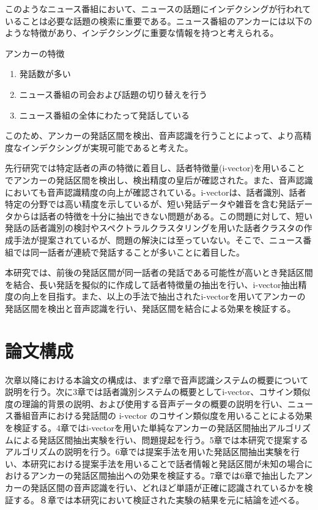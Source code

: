 このようなニュース番組において、ニュースの話題にインデクシングが行われていることは必要な話題の検索に重要である。ニュース番組のアンカーには以下のような特徴があり、インデクシングに重要な情報を持つと考えられる。\newline

アンカーの特徴
\begin{enumerate}
\item 発話数が多い
\item ニュース番組の司会および話題の切り替えを行う
\item ニュース番組の全体にわたって発話している
\end{enumerate}\par

このため、アンカーの発話区間を検出、音声認識を行うことによって、より高精度なインデクシングが実現可能であると考えた。\par
先行研究では特定話者の声の特徴に着目し、話者特徴量(i-vector)を用いることでアンカーの発話区間を検出し、検出精度の皇后が確認された。また、音声認識においても音声認識精度の向上が確認されている。i-vectorは、話者識別、話者特定の分野では高い精度を示しているが、短い発話データや雑音を含む発話データからは話者の特徴を十分に抽出できない問題がある。この問題に対して、短い発話の話者識別の検討\cite{panaiv}やスペクトラルクラスタリングを用いた話者クラスタの作成手法\cite{spectroclus}が提案されているが、問題の解決には至っていない。そこで、ニュース番組では同一話者が連続で発話することが多いことに着目した。\par
本研究では、前後の発話区間が同一話者の発話である可能性が高いとき発話区間を結合、長い発話を擬似的に作成して話者特徴量の抽出を行い、i-vector抽出精度の向上を目指す。また、以上の手法で抽出されたi-vectorを用いてアンカーの発話区間を検出と音声認識を行い、発話区間を結合による効果を検証する。

\section{論文構成}
次章以降における本論文の構成は、まず2章で音声認識システムの概要について説明を行う。次に3章では話者識別システムの概要としてi-vector、コサイン類似度の理論的背景の説明、および使用する音声データの概要の説明を行い、ニュース番組音声における発話間の i-vector のコサイン類似度を用いることによる効果を検証する。4章ではi-vectorを用いた単純なアンカーの発話区間抽出アルゴリズムによる発話区間抽出実験を行い、問題提起を行う。5章では本研究で提案するアルゴリズムの説明を行う。6章では提案手法を用いた発話区間抽出実験を行い、本研究における提案手法を用いることで話者情報と発話区間が未知の場合におけるアンカーの発話区間抽出への効果を検証する。7章では6章で抽出したアンカーの発話区間の音声認識を行い、どれほど単語が正確に認識されているかを検証する。８章では本研究において検証された実験の結果を元に結論を述べる。

